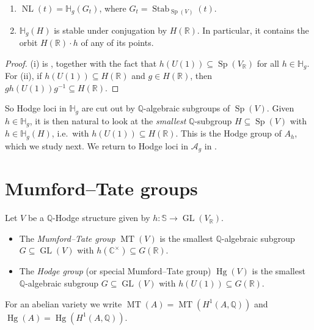 \documentclass[12pt]{amsart}
\newcommand{\R}{\mathbb{R}}
\newcommand{\Q}{\mathbb{Q}}
\newcommand{\C}{\mathbb{C}}
\newcommand{\Del}{\mathbb{S}}
\DeclareMathOperator{\GL}{GL}
\DeclareMathOperator{\Sp}{Sp}
\DeclareMathOperator{\MT}{MT}
\DeclareMathOperator{\Hg}{Hg}
\DeclareMathOperator{\NL}{NL}
\DeclareMathOperator{\Stab}{Stab}
\newcommand{\cA}{\mathcal{A}}
\newcommand{\HH}{\mathbb{H}}
\theoremstyle{definition}
\theoremstyle{remark}
\numberwithin{equation}{section}
\begin{document}
\begin{proposition}
    \begin{enumerate}[label=(\roman*)]
        \item $\NL(t) = \HH_g(G_t)$, where $G_t = \Stab_{\Sp(V)}(t)$.
        \item $\HH_g(H)$ is stable under conjugation by $H(\R)$. In particular,
        it contains the orbit $H(\R) \cdot h$ of any of its points.
    \end{enumerate}
\end{proposition}
\begin{proof}
    (i) is , together with the fact that
    $h(U(1)) \subseteq \Sp(V_\R)$ for all $h \in \HH_g$. For (ii), if
    $h(U(1)) \subseteq H(\R)$ and $g \in H(\R)$, then
    $g h(U(1)) g^{-1} \subseteq H(\R)$.
\end{proof}

So Hodge loci in $\HH_g$ are cut out by $\Q$-algebraic subgroups of $\Sp(V)$.
Given $h \in \HH_g$, it is then natural to look at the \emph{smallest}
$\Q$-subgroup $H \subseteq \Sp(V)$ with $h \in \HH_g(H)$, i.e.\ with
$h(U(1)) \subseteq H(\R)$. This is the Hodge group of $A_h$, which we study
next. We return to Hodge loci in $\cA_g$ in .

\section{Mumford--Tate groups}

\begin{definition}
    Let $V$ be a $\Q$-Hodge structure given by $h \colon \Del \to \GL(V_\R)$.
    \begin{itemize}
        \item The \emph{Mumford--Tate group} $\MT(V)$ is the smallest
        $\Q$-algebraic subgroup $G \subseteq \GL(V)$ with
        $h(\C^\times) \subseteq G(\R)$.
        \item The \emph{Hodge group} (or special Mumford--Tate group) $\Hg(V)$
        is the smallest $\Q$-algebraic subgroup $G \subseteq \GL(V)$ with
        $h(U(1)) \subseteq G(\R)$.
    \end{itemize}
    For an abelian variety we write $\MT(A) = \MT(H^1(A, \Q))$ and
    $\Hg(A) = \Hg(H^1(A,\Q))$.
\end{definition}
\end{document}
